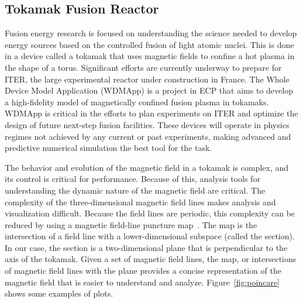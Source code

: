 \subsection{Tokamak Fusion Reactor}


Fusion energy research is focused on understanding the science needed to develop energy sources based on the controlled fusion of light atomic nuclei. This is done in a device called a tokamak that uses magnetic fields to confine a hot plasma in the shape of a torus.
Significant efforts are currently underway to prepare for ITER, the large experimental reactor under construction in France.
The Whole Device Model Application (WDMApp) is a project in ECP that aims to develop a high-fidelity model of magnetically confined fusion plasma in tokamaks. 
WDMApp is critical in the efforts to plan experiments on ITER and optimize the design of future next-step fusion facilities. These devices will operate in physics regimes not achieved by any current or past experiments, making advanced and predictive numerical simulation the best tool for the task.




The behavior and evolution of the magnetic field in a tokamak is complex, and its control is critical for performance.
Because of this, analysis tools for understanding the dynamic nature of the magnetic field are critical.
The complexity of the three-dimensional magnetic field lines makes analysis and visualization difficult.
Because the field lines are periodic, this complexity can be reduced by using a \poincare magnetic field-line puncture map~\cite{Sanderson2010}. 
The \poincare map is the intersection of a field line with a lower-dimensional subspace (called the \poincare section).
In our case, the \poincare section is a two-dimensional plane that is perpendicular to the axis of the tokamak.
Given a set of magnetic field lines, the \poincare map, or intersections of magnetic field lines with the plane provides a concise 
representation of the magnetic field that is easier to understand and analyze.
Figure~\ref{fig:poincare} shows some examples of \poincare plots.

